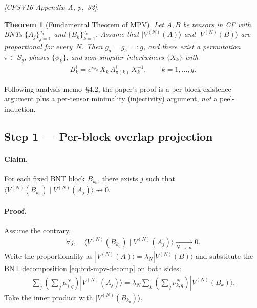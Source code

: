 \documentclass{article}
\newcommand{\paperref}[1]{\textit{[CPSV16 #1]}}
\theoremstyle{plain}
\newtheorem{theorem}{Theorem}
\begin{document}
\paperref{Appendix~A, p.~32}.

\begin{theorem}[Fundamental Theorem of MPV]
    Let $A, B$ be tensors in CF with BNTs $\{A_j\}_{j=1}^{g_a}$ and
    $\{B_k\}_{k=1}^{g_b}$. Assume that $|V^{(N)}(A)\rangle$ and
    $|V^{(N)}(B)\rangle$ are proportional for every~$N$. Then $g_a = g_b
        =: g$, and there exist a permutation $\pi \in S_g$, phases $\{\phi_k\}$,
    and non-singular intertwiners $\{X_k\}$ with
    \begin{align}
        B_k^i = e^{i\phi_k}\, X_k\, A_{\pi(k)}^i\, X_k^{-1},
        \qquad k = 1, \ldots, g.
    \end{align}
\end{theorem}

Following analysis memo~\S4.2, the paper's proof is a per-block existence
argument plus a per-tensor minimality (injectivity) argument, \emph{not}
a peel-induction.

\subsection{Step 1 --- Per-block overlap projection}
\label{sec:step1}

\paragraph{Claim.}
For each fixed BNT block $B_{k_0}$, there exists $j$ such that
$\langle V^{(N)}(B_{k_0}) \mid V^{(N)}(A_j) \rangle \not\to 0$.

\paragraph{Proof.}
Assume the contrary,
\begin{align}
    \forall j,\quad
    \langle V^{(N)}(B_{k_0}) \mid V^{(N)}(A_j) \rangle
    \xrightarrow[N\to\infty]{} 0.
    \tag{hAllDecay}
    \label{eq:hAllDecay}
\end{align}
Write the proportionality as $|V^{(N)}(A)\rangle = \lambda_N
    |V^{(N)}(B)\rangle$ and substitute the BNT decomposition
\eqref{eq:bnt-mpv-decomp} on both sides:
\begin{align}
    \sum_{j} \left(\sum_q \mu_{j,q}^N\right) |V^{(N)}(A_j)\rangle
    = \lambda_N \sum_{k} \left(\sum_q \nu_{k,q}^N\right) |V^{(N)}(B_k)\rangle.
    \label{eq:bnt-proportional}
\end{align}
Take the inner product with $|V^{(N)}(B_{k_0})\rangle$.
\end{document}
